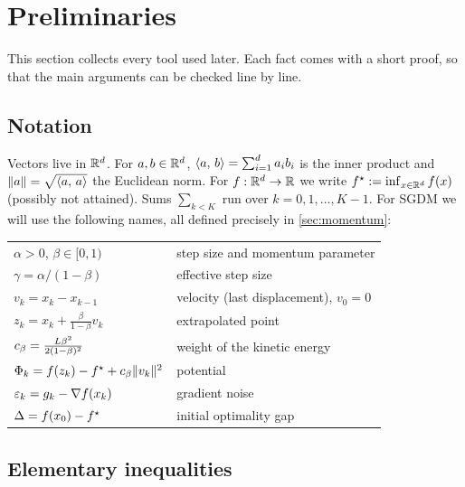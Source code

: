 \section{Preliminaries}\label{sec:prelim}

This section collects every tool used later. Each fact comes with a short proof, so that
the main arguments can be checked line by line.

\subsection{Notation}

Vectors live in $\mathbb{R}^d$. For $a,b\in\mathbb{R}^d$, $\langle a,\, b\rangle=\sum_{i=1}^d a_ib_i$ is the inner
product and $\lVert a\rVert=\sqrt{\langle a,\, a\rangle}$ the Euclidean norm. For $f:\mathbb{R}^d\to\mathbb{R}$ we write
$f^\star:=\inf_{x\in\mathbb{R}^d}f(x)$ (possibly not attained). Sums $\sum_{k<K}$ run over
$k=0,1,\dots,K-1$. For SGDM we will use the following names, all defined precisely in
\cref{sec:momentum}:
\begin{center}\small
\begin{tabular}{@{}ll@{}}
\toprule
$\alpha>0$, $\beta\in[0,1)$ & step size and momentum parameter\\
$\gamma=\alpha/(1-\beta)$ & effective step size\\
$v_k=x_k-x_{k-1}$ & velocity (last displacement), $v_0=0$\\
$z_k=x_k+\frac{\beta}{1-\beta}v_k$ & extrapolated point\\
$c_\beta=\frac{L\beta^2}{2(1-\beta)^2}$ & weight of the kinetic energy\\
$\Phi_k=f(z_k)-f^\star+c_\beta\lVert v_k\rVert^2$ & potential\\
$\varepsilon_k=g_k-\nabla f(x_k)$ & gradient noise\\
$\Delta=f(x_0)-f^\star$ & initial optimality gap\\
\bottomrule
\end{tabular}
\end{center}

\subsection{Elementary inequalities}

